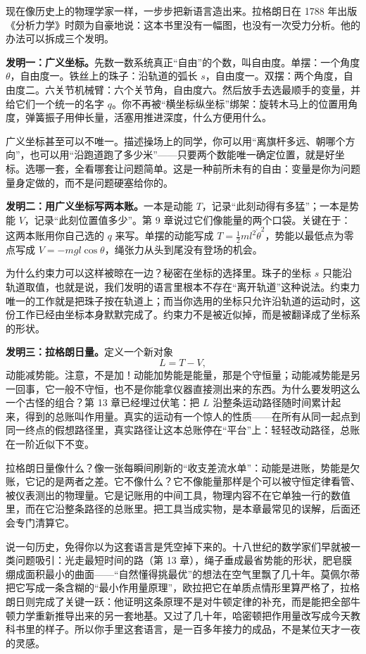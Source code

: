 \begin{mainline}
现在像历史上的物理学家一样，一步步把新语言造出来。拉格朗日在 1788 年出版《分析力学》时颇为自豪地说：这本书里没有一幅图，也没有一次受力分析。他的办法可以拆成三个发明。

\textbf{发明一：广义坐标。}先数一数系统真正“自由”的个数，叫自由度。单摆：一个角度 \(\theta\)，自由度一。铁丝上的珠子：沿轨道的弧长 \(s\)，自由度一。双摆：两个角度，自由度二。六关节机械臂：六个关节角，自由度六。然后放手去选最顺手的变量，并给它们一个统一的名字 \(q\)。你不再被“横坐标纵坐标”绑架：旋转木马上的位置用角度，弹簧振子用伸长量，活塞用推进深度，什么方便用什么。

广义坐标甚至可以不唯一。描述操场上的同学，你可以用“离旗杆多远、朝哪个方向”，也可以用“沿跑道跑了多少米”——只要两个数能唯一确定位置，就是好坐标。选哪一套，全看哪套让问题简单。这是一种前所未有的自由：变量是你为问题量身定做的，而不是问题硬塞给你的。

\textbf{发明二：用广义坐标写两本账。}一本是动能 \(T\)，记录“此刻动得有多猛”；一本是势能 \(V\)，记录“此刻位置值多少”。第 9 章说过它们像能量的两个口袋。关键在于：这两本账用你自己选的 \(q\) 来写。单摆的动能写成 \(T=\frac{1}{2}ml^2\dot{\theta}^2\)，势能以最低点为零点写成 \(V=-mgl\cos\theta\)，绳张力从头到尾没有登场的机会。

为什么约束力可以这样被晾在一边？秘密在坐标的选择里。珠子的坐标 \(s\) 只能沿轨道取值，也就是说，我们发明的语言里根本不存在“离开轨道”这种说法。约束力唯一的工作就是把珠子按在轨道上；而当你选用的坐标只允许沿轨道的运动时，这份工作已经由坐标本身默默完成了。约束力不是被近似掉，而是被翻译成了坐标系的形状。

\textbf{发明三：拉格朗日量。}定义一个新对象
\[
L=T-V,
\]
动能减势能。注意，不是加！动能加势能是能量，那是个守恒量；动能减势能是另一回事，它一般不守恒，也不是你能拿仪器直接测出来的东西。为什么要发明这么一个古怪的组合？第 13 章已经埋过伏笔：把 \(L\) 沿整条运动路径随时间累计起来，得到的总账叫作用量。真实的运动有一个惊人的性质——在所有从同一起点到同一终点的假想路径里，真实路径让这本总账停在“平台”上：轻轻改动路径，总账在一阶近似下不变。

拉格朗日量像什么？像一张每瞬间刷新的“收支差流水单”：动能是进账，势能是欠账，它记的是两者之差。它不像什么？它不像能量那样是个可以被守恒定律看管、被仪表测出的物理量。它是记账用的中间工具，物理内容不在它单独一行的数值里，而在它沿整条路径的总账里。把工具当成实物，是本章最常见的误解，后面还会专门清算它。

说一句历史，免得你以为这套语言是凭空掉下来的。十八世纪的数学家们早就被一类问题吸引：光走最短时间的路（第 13 章），绳子垂成最省势能的形状，肥皂膜绷成面积最小的曲面——“自然懂得挑最优”的想法在空气里飘了几十年。莫佩尔蒂把它写成一条含糊的“最小作用量原理”，欧拉把它在单质点情形里算严格了，拉格朗日则完成了关键一跃：他证明这条原理不是对牛顿定律的补充，而是能把全部牛顿力学重新推导出来的另一套地基。又过了几十年，哈密顿把作用量改写成今天教科书里的样子。所以你手里这套语言，是一百多年接力的成品，不是某位天才一夜的灵感。


\end{mainline}
